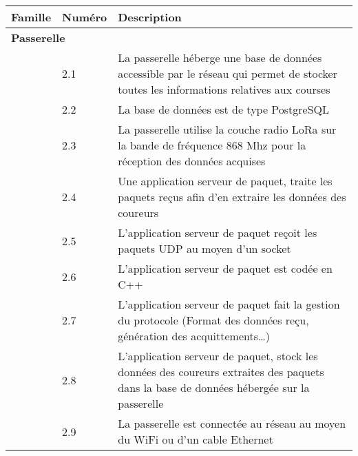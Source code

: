 \begin{tabular}{llp{10cm}}
\toprule
Famille & Numéro & Description \\
\midrule
\multicolumn{2}{l}{\textbf{Passerelle}} \\
 & 2.1 & La passerelle héberge une base de données accessible par le réseau qui permet de stocker toutes les informations relatives aux courses \\
 & 2.2 & La base de données est de type PostgreSQL \\
 & 2.3 & La passerelle utilise la couche radio LoRa sur la bande de fréquence 868 Mhz pour la réception des données acquises \\
 & 2.4 & Une application serveur de paquet, traite les paquets reçus afin d’en extraire les données des coureurs\\
 & 2.5 & L’application serveur de paquet reçoit les paquets UDP au moyen d’un socket  \\
 & 2.6 & L’application serveur de paquet est codée en C++ \\
 & 2.7 & L’application serveur de paquet fait la gestion du protocole (Format des données reçu, génération des acquittements…) \\
 & 2.8 & L’application serveur de paquet, stock les données des coureurs extraites des paquets dans la base de données hébergée sur la passerelle \\
 & 2.9 & La passerelle est connectée au réseau au moyen du WiFi ou d’un cable Ethernet \\
\bottomrule
\end{tabular}

